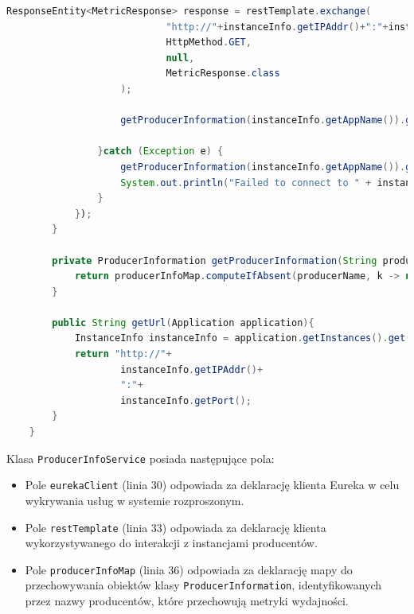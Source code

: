 \begin{lstlisting}[language=Java, caption=Kod usługi ProducerInfoService,label=ProducerInfoServiceCode]
                    ResponseEntity<MetricResponse> response = restTemplate.exchange(
                            "http://"+instanceInfo.getIPAddr()+":"+instanceInfo.getPort()+"/actuator/metrics/system.load.average.1m",
                            HttpMethod.GET,
                            null,
                            MetricResponse.class
                    );
    
                    getProducerInformation(instanceInfo.getAppName()).getMeasurementBufferSystemLoadAverage1m().addMeasurement(response.getBody().getMeasurements().get(0).getValue());
    
                }catch (Exception e) {
                    getProducerInformation(instanceInfo.getAppName()).getMeasurementBufferSystemLoadAverage1m().addMeasurement(Double.MAX_VALUE);
                    System.out.println("Failed to connect to " + instanceInfo.getIPAddr() + ":" + instanceInfo.getPort() + "-> "+e.getMessage());
                }
            });
        }
    
        private ProducerInformation getProducerInformation(String producerName) {
            return producerInfoMap.computeIfAbsent(producerName, k -> new ProducerInformation());
        }
    
        public String getUrl(Application application){
            InstanceInfo instanceInfo = application.getInstances().get(0);
            return "http://"+
                    instanceInfo.getIPAddr()+
                    ":"+
                    instanceInfo.getPort();
        }
    }

\end{lstlisting}

Klasa \verb|ProducerInfoService| posiada następujące pola:
\begin{itemize}
    \item Pole \verb|eurekaClient| (linia 30) odpowiada za deklarację klienta Eureka w celu wykrywania usług w systemie rozproszonym.
    \item Pole \verb|restTemplate| (linia 33) odpowiada za deklarację klienta  wykorzystywanego do interakcji z instancjami producentów.
    \item Pole \verb|producerInfoMap| (linia 36) odpowiada za deklarację mapy do przechowywania obiektów klasy \verb|ProducerInformation|, identyfikowanych przez nazwy producentów, które przechowują metryki wydajności.
\end{itemize}

